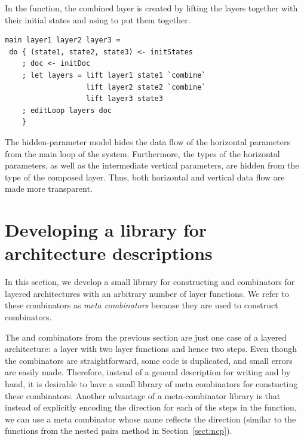 \documentclass[preprint,natbib]{sigplanconf}
\begin{document}
In the  function, the combined layer is created by lifting the layers together with their initial states and using  to put them together.

\begin{small}
\begin{verbatim}
main layer1 layer2 layer3 =
 do { (state1, state2, state3) <- initStates
    ; doc <- initDoc 
    ; let layers = lift layer1 state1 `combine` 
                   lift layer2 state2 `combine`
                   lift layer3 state3
    ; editLoop layers doc
    }
\end{verbatim}
\end{small}


The hidden-parameter model hides the data flow of the horizontal parameters from the main loop of the system. Furthermore, the types of the horizontal parameters, as well as the intermediate vertical parameters, are hidden from the type of the composed layer. Thus, both horizontal and vertical data flow are made more transparent. 



%																
%																
%																
\section{Developing a library for architecture descriptions} \label{sect:lib}

In this section, we develop a small library for constructing  and  combinators for layered architectures with an arbitrary number of layer functions. We refer to these combinators as {\em meta combinators} because they are used to construct combinators.

The  and  combinators from the previous section are just one case of a layered architecture: a layer with two layer functions and hence two steps. Even though the combinators are straightforward, some code is duplicated, and small errors are easily made. Therefore, instead of a general description for writing  and  by hand, it is desirable to have a small library of meta combinators for constucting these combinators. Another advantage of a meta-combinator library is that instead of explicitly encoding the direction for each of the steps in the  function, we can use a meta combinator whose name reflects the direction (similar to the  functions from the nested pairs method in Section~\ref{sect:ncp}).
\end{document}
